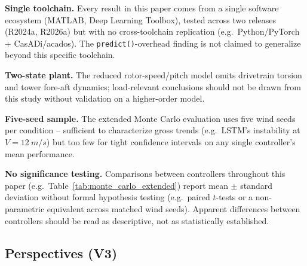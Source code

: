 \textbf{Single toolchain.} Every result in this paper comes from a
single software ecosystem (MATLAB, Deep Learning Toolbox), tested
across two releases (R2024a, R2026a) but with no cross-toolchain
replication (e.g.\ Python/PyTorch + CasADi/acados). The
\texttt{predict()}-overhead finding is not claimed to generalize beyond
this specific toolchain.

\textbf{Two-state plant.} The reduced rotor-speed/pitch model omits
drivetrain torsion and tower fore-aft dynamics; load-relevant
conclusions should not be drawn from this study without validation on
a higher-order model.

\textbf{Five-seed sample.} The extended Monte Carlo evaluation uses
five wind seeds per condition -- sufficient to characterize gross
trends (e.g.\ LSTM's instability at $V=\SI{12}{m/s}$) but too few for
tight confidence intervals on any single controller's mean performance.

\textbf{No significance testing.} Comparisons between controllers
throughout this paper (e.g.\ Table~\ref{tab:monte_carlo_extended})
report mean $\pm$ standard deviation without formal hypothesis
testing (e.g.\ paired $t$-tests or a non-parametric equivalent across
matched wind seeds). Apparent differences between controllers should be
read as descriptive, not as statistically established.

\subsection{Perspectives (V3)}
\label{subsec:perspectives_v3}

